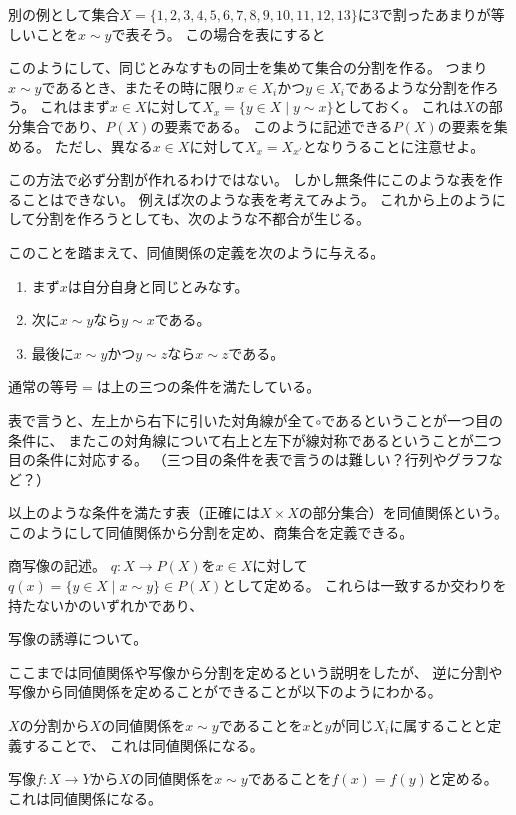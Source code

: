 別の例として集合$X=\{1,2,3,4,5,6,7,8,9,10,11,12,13\}$に$3$で割ったあまりが等しいことを$x\sim y$で表そう。
この場合を表にすると

このようにして、同じとみなすもの同士を集めて集合の分割を作る。
つまり$x\sim y$であるとき、またその時に限り$x\in X_i$かつ$y\in X_i$であるような分割を作ろう。
これはまず$x\in X$に対して$X_x=\{y\in X\mid y\sim x\}$としておく。
これは$X$の部分集合であり、$P(X)$の要素である。
このように記述できる$P(X)$の要素を集める。
ただし、異なる$x\in X$に対して$X_x=X_{x'}$となりうることに注意せよ。

この方法で必ず分割が作れるわけではない。
しかし無条件にこのような表を作ることはできない。
例えば次のような表を考えてみよう。
これから上のようにして分割を作ろうとしても、次のような不都合が生じる。

このことを踏まえて、同値関係の定義を次のように与える。
\begin{enumerate}
\item まず$x$は自分自身と同じとみなす。
\item 次に$x\sim y$なら$y\sim x$である。
\item 最後に$x\sim y$かつ$y\sim z$なら$x\sim z$である。
\end{enumerate}

通常の等号$=$は上の三つの条件を満たしている。

表で言うと、左上から右下に引いた対角線が全て$\circ$であるということが一つ目の条件に、
またこの対角線について右上と左下が線対称であるということが二つ目の条件に対応する。
（三つ目の条件を表で言うのは難しい？行列やグラフなど？）

以上のような条件を満たす表（正確には$X\times X$の部分集合）を同値関係という。
このようにして同値関係から分割を定め、商集合を定義できる。

商写像の記述。
$q:X \to P(X)$を$x\in X$に対して$q(x)=\{y\in X\mid x\sim y\}\in P(X)$として定める。
これらは一致するか交わりを持たないかのいずれかであり、

写像の誘導について。


ここまでは同値関係や写像から分割を定めるという説明をしたが、
逆に分割や写像から同値関係を定めることができることが以下のようにわかる。

\begin{prop}
  $X$の分割から$X$の同値関係を$x\sim y$であることを$x$と$y$が同じ$X_i$に属することと定義することで、
  これは同値関係になる。
\end{prop}

\begin{prop}
  写像$f:X\to Y$から$X$の同値関係を$x\sim y$であることを$f(x)=f(y)$と定める。
  これは同値関係になる。
\end{prop}


